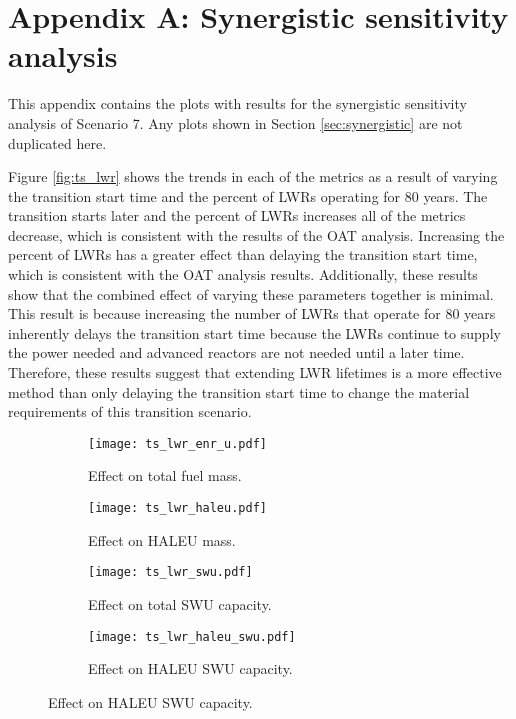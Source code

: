 \chapter{Appendix A: Synergistic sensitivity analysis}\label{app:s7_synergistic}
This appendix contains the plots with results for the synergistic 
sensitivity analysis of Scenario 7. Any plots shown in Section 
\ref{sec:synergistic} are not duplicated here.

Figure \ref{fig:ts_lwr} shows the trends in each of the metrics as a result
of varying the transition start time and the percent of \glspl{LWR} 
operating for 80 years. The transition starts later and the percent of 
\glspl{LWR} increases all of the metrics decrease, which is consistent 
with the results of the \gls{OAT} analysis. Increasing the percent of 
\glspl{LWR} has a greater effect than delaying the transition start time, 
which is consistent with the \gls{OAT} analysis results.
Additionally, these results show that 
the combined effect of varying these parameters together is minimal. 
This result is because increasing the number of \glspl{LWR} that 
operate for 80 years inherently delays the transition start time 
because the \glspl{LWR} continue to supply the power needed and 
advanced reactors are not needed until a later time. Therefore, these 
results suggest that extending \gls{LWR} lifetimes is a more effective 
method than only delaying the transition start time to change the material 
requirements of this transition scenario. 

\begin{figure}
    \begin{subfigure}[t]{0.48\textwidth}
        \centering
        \texttt{[image: ts\_lwr\_enr\_u.pdf]}
        \caption{Effect on total fuel mass.}
        \label{fig:ts_lwr_enr_u}
    \end{subfigure}
    \hfill
    \begin{subfigure}[t]{0.48\textwidth}
        \centering
        \texttt{[image: ts\_lwr\_haleu.pdf]}
        \caption{Effect on HALEU mass.}
        \label{fig:ts_lwr_haleu}
    \end{subfigure}
    
    \begin{subfigure}[t]{0.48\textwidth}
        \centering
        \texttt{[image: ts\_lwr\_swu.pdf]}
        \caption{Effect on total SWU capacity.}
        \label{fig:ts_lwr_swu}
    \end{subfigure}
    \hfill
    \begin{subfigure}[t]{0.48\textwidth}
        \centering
        \texttt{[image: ts\_lwr\_haleu\_swu.pdf]}
        \caption{Effect on HALEU SWU capacity.}
        \label{fig:ts_lwr_haleu_swu}
    \end{subfigure}
\end{figure}

